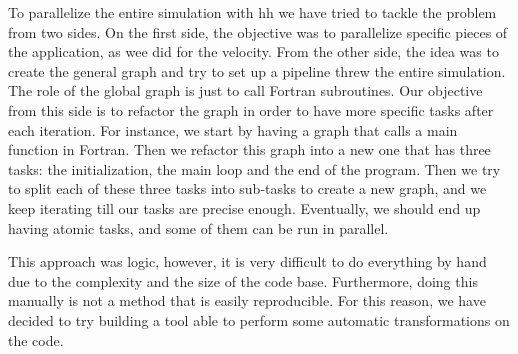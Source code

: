 To parallelize the entire simulation with \gls{hh} we have tried to tackle the
problem from two sides. On the first side, the objective was to parallelize
specific pieces of the application, as wee did for the velocity. From the other
side, the idea was to create the general graph and try to set up a pipeline
threw the entire simulation. The role of the global graph is just to call
Fortran subroutines. Our objective from this side is to refactor the graph in
order to have more specific tasks after each iteration. For instance, we start
by having a graph that calls a main function in Fortran. Then we refactor this
graph into a new one that has three tasks: the initialization, the main loop and
the end of the program. Then we try to split each of these three tasks into
sub-tasks to create a new graph, and we keep iterating till our tasks are
precise enough. Eventually, we should end up having atomic tasks, and some of
them can be run in parallel.

This approach was logic, however, it is very difficult to do everything by hand
due to the complexity and the size of the code base. Furthermore, doing this
manually is not a method that is easily reproducible. For this reason, we have
decided to try building a tool able to perform some automatic transformations on
the code.

